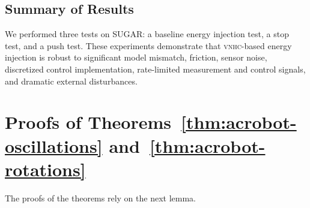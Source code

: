 \documentclass[journal,twoside,web, twocolumn,draftcls]{ieeecolor}
\newcommand*{\vnhc}{\textsc{vnhc}\xspace}
\begin{document}
\subsection{Summary of Results} 
We performed three tests on SUGAR: a baseline energy injection test,
a stop test, and a push test.
These experiments demonstrate that \vnhc-based energy injection is robust to
significant model mismatch, friction, sensor noise, discretized control
implementation, rate-limited measurement and control signals, and dramatic
external disturbances.

\section{Proofs of Theorems~\ref{thm:acrobot-oscillations} and~\ref{thm:acrobot-rotations}}\label{sec:proof}

The proofs of the theorems rely on the next lemma.
\end{document}

